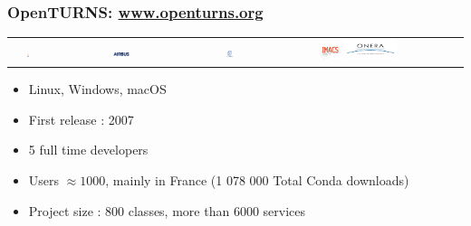\documentclass{beamer}
\begin{document}
\begin{frame}
\frametitle{OpenTURNS: \url{www.openturns.org}}

\begin{center}
   \begin{tabular}{ccccc}
   \includegraphics[width=0.07\textwidth]{figures/logoEDF_Anne.png}&
   \includegraphics[width=0.12\textwidth]{figures/LogoAirbus.png}&
   \includegraphics[width=0.12\textwidth]{figures/logo_phimeca.png}&
   \includegraphics[width=0.12\textwidth]{figures/logo_Imacs.png}
   \includegraphics[width=0.30\textwidth]{figures/logo_ONERA.jpg}&
   \end{tabular}
\end{center}

\vspace*{0.05cm}
\begin{itemize}
\item Linux, Windows, macOS
\item First release : 2007
\item 5 full time developers
\item Users $\approx 1000$, mainly in France
(1 078 000 Total Conda downloads)
\item Project size : 800  classes, more than 6000 services
\end{itemize}


\end{frame}

\end{document}

